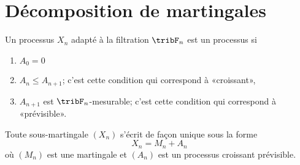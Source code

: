 \section{Décomposition de martingales}

\begin{definition}
	Un processus \( X_n\) adapté à la filtration \( \tribF_n\) est un processus  si
	\begin{enumerate}
		\item
		      \( A_0=0\)
		\item
		      \( A_n\leq A_{n+1}\); c'est cette condition qui correspond à «croissant»,
		\item
		      \( A_{n+1}\) est \( \tribF_n\)-mesurable; c'est cette condition qui correspond à «prévisible».
	\end{enumerate}
\end{definition}

\begin{proposition}
	Toute sous-martingale \( (X_n)\) s'écrit de façon unique sous la forme
	\begin{equation}\label{EqCCsAwbZ}
		X_n=M_n+A_n
	\end{equation}
	où \( (M_n)\) est une martingale et \( (A_n)\) est un processus croissant prévisible.
\end{proposition}

